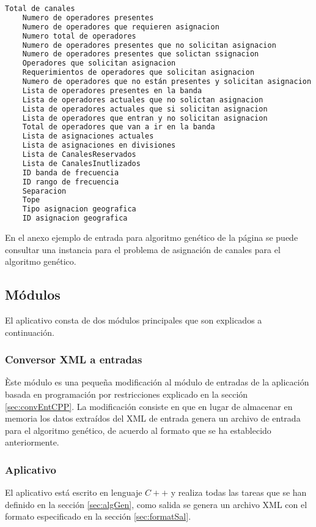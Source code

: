 \lstset{frameround=fttt}
\begin{lstlisting}[frame=trBL, language=bash]
	Total de canales
	Numero de operadores presentes
	Numero de operadores que requieren asignacion
	Numero total de operadores
	Numero de operadores presentes que no solicitan asignacion
	Numero de operadores presentes que solictan ssignacion
	Operadores que solicitan asignacion
	Requerimientos de operadores que solicitan asignacion
	Numero de operadores que no están presentes y solicitan asignacion 
	Lista de operadores presentes en la banda
	Lista de operadores actuales que no solictan asignacion
	Lista de operadores actuales que si solicitan asignacion
	Lista de operadores que entran y no solicitan asignacion
	Total de operadores que van a ir en la banda
	Lista de asignaciones actuales
	Lista de asignaciones en divisiones
	Lista de CanalesReservados
	Lista de CanalesInutlizados
	ID banda de frecuencia
	ID rango de frecuencia
	Separacion
	Tope
	Tipo asignacion geografica
	ID asignacion geografica
\end{lstlisting}

En el anexo ejemplo de entrada para algoritmo genético de la página \pageref{anexo:inGenetico} se puede consultar una instancia para el problema de asignación de canales para el algoritmo genético.

\subsection{Módulos}

El aplicativo consta de dos módulos principales que son explicados a continuación.

\subsubsection{Conversor XML a entradas} \label{sec:conxmlgenetico}

Èste módulo es una pequeña modificación al módulo de entradas de la aplicación basada en programación por restricciones explicado en la sección \ref{sec:convEntCPP}. La modificación consiste en que en lugar de almacenar en memoria los datos extraídos del XML de entrada genera un archivo de entrada para el algoritmo genético, de acuerdo al formato que se ha establecido anteriormente.

\subsubsection{Aplicativo}

El aplicativo está escrito en lenguaje $C++$ y realiza todas las tareas que se han definido en la sección \ref{sec:algGen}, como salida se genera un archivo XML con el formato especificado en la sección \ref{sec:formatSal}.
